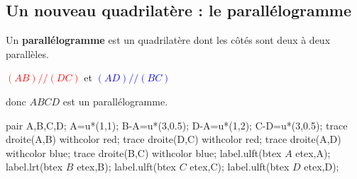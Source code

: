 \begin{changemargin}{-5mm}{-15mm}
    \section{Un nouveau quadrilatère : le parallélogramme}
    \begin{definition}
        \begin{minipage}{0.5\linewidth}
            Un \textbf{parallélogramme} est un quadrilatère dont les côtés sont deux à deux parallèles.

            \bigskip
            \textcolor{red}{$(AB)//(DC)$} et \textcolor{blue}{$(AD)//(BC)$} 
            
            donc $ABCD$ est un parallélogramme.
        \end{minipage}
        \hfill
        \begin{minipage}{0.4\linewidth}
            \begin{Geometrie}[CoinHD={(6u,4u)}]
                pair A,B,C,D;
                A=u*(1,1);
                B-A=u*(3,0.5);
                D-A=u*(1,2);
                C-D=u*(3,0.5);
                trace droite(A,B) withcolor red;
                trace droite(D,C) withcolor red;
                trace droite(A,D) withcolor blue;
                trace droite(B,C) withcolor blue;
                label.ulft(btex $A$ etex,A);
                label.lrt(btex $B$ etex,B);
                label.ulft(btex $C$ etex,C);
                label.ulft(btex $D$ etex,D);
            \end{Geometrie}
        \end{minipage}
    \end{definition}
\end{changemargin}
